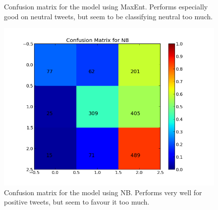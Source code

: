 \begin{minipage}[!htb]{\linewidth}
\begin{minipage}{0.45\linewidth}
\begin{figure}[H]
           \caption[Plot showing the confusion matrix for MaxEnt]{Confusion matrix for the model using MaxEnt. Performs especially good on neutral tweets, but seem to be classifying neutral too much.}
           \label{fig:confmat_maxent}
          \end{figure}
     \end{minipage}
 \end{minipage}    
 
 \begin{minipage}[!htb]{\linewidth}
      \centering
     \begin{minipage}{0.45\linewidth}
          \begin{figure}[H]
               \includegraphics[width=\linewidth]{../img/plots/grid/confusion_matrix_NB.png}
           \caption[Plot showing the confusion matrix for NB]{Confusion matrix for the model using NB. Performs very well for positive tweets, but seem to favour it too much.}
           \label{fig:confmat_nb}
          \end{figure}
     \end{minipage}
     \hspace{0.05\linewidth}
     \begin{minipage}{0.45\linewidth}
          \begin{figure}[H]

\end{figure}
\end{minipage}
\end{minipage}
